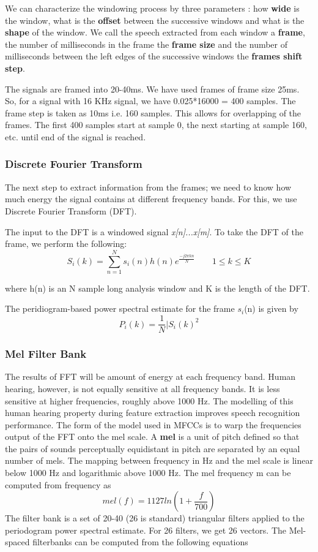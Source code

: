 We can characterize the windowing process by three parameters : how \textbf{wide} is the window, what is the \textbf{offset} between the successive windows and what is the \textbf{shape} of the window.
We call the speech extracted  from each window a \textbf{frame}, the number of milliseconds in the frame the \textbf{frame size} and the number of milliseconds between the left edges of the successive windows the \textbf{frames shift step}.

The signals are framed into 20-40ms. We have used frames of frame size 25ms. So, for a signal with 16 KHz signal, we have 0.025*16000 = 400 samples. The frame step is taken as 10ms i.e. 160 samples. This allows for overlapping of the frames. The first 400 samples start at sample 0, the next starting at sample 160, etc. until end of the signal is reached.

\subsubsection{Discrete Fourier Transform}
The next step to extract information from the frames; we need to know how much energy the signal contains at different frequency bands. For this, we use Discrete Fourier Transform (DFT).

The input to the DFT is a windowed signal \textit{x[n]...x[m]}. To take the DFT of the frame, we perform the following:
\begin{equation}
S_i(k) = \sum_{n=1}^{N}s_i(n)h(n)e^{\frac{-j2 \pi kn}{N}}\quad\quad  1\leq k\leq K 
\end{equation}


where h(n) is an N sample long analysis window and K is the length of the DFT.


The peridiogram-based power spectral estimate for the frame $s_i$(n) is given by
\begin{equation}
P_i(k) = \frac{1}{N}|S_i(k)^2 
\end{equation}

\subsubsection{Mel Filter Bank}
The results of FFT will be amount of energy at each frequency band. Human hearing, however, is not equally sensitive at all frequency bands. It is less sensitive at higher frequencies, roughly above 1000 Hz. The modelling of this human hearing property during feature extraction improves speech recognition performance. The form of the model used in MFCCs is to warp the frequencies output of the FFT onto the mel scale. A \textbf{mel} is a unit of pitch defined so that the pairs of sounds perceptually equidistant in pitch are separated by an equal number of mels. The mapping between frequency in Hz and the mel scale is linear below 1000 Hz and logarithmic above 1000 Hz. The mel frequency m can be computed from frequency as 
\begin{equation}
mel(f)=1127ln(1+\frac{f}{700})
\end{equation}
The filter bank is a set of 20-40 (26 is standard) triangular filters applied to the periodogram power spectral estimate. For 26 filters, we get 26 vectors. The Mel-spaced filterbanks can be computed from the following equations


